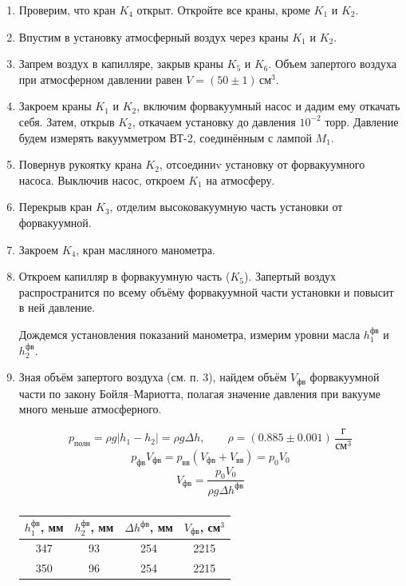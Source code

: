 \documentclass[a4paper,12pt]{article} %
\begin{document}
\begin{enumerate}

  \item Проверим, что кран $K_4$ открыт. Откройте все краны, кроме $K_1$ и $K_2$. 
  \item Впустим в установку атмосферный воздух через краны $K_1$ и $K_2$.
  \item Запрем воздух в капилляре, закрыв краны $K_5$ и $K_6$. Объем запертого воздуха при атмосферном давлении равен $V = (50 \pm 1) \, \text{см}^3$.
  \item Закроем краны $K_1$ и $K_2$, включим форвакуумный насос и дадим ему откачать себя. Затем, открыв $K_2$, откачаем установку до давления $10^{-2}$ торр. Давление будем измерять вакуумметром ВТ-2, соединённым с лампой $M_1$. 
  \item Повернув рукоятку крана $K_2$, отсоединиv установку от форвакуумного насоса. Выключив насос, откроем $K_1$ на атмосферу.
  \item Перекрыв кран $K_3$, отделим высоковакуумную часть установки от форвакуумной.
  \item Закроем $K_4$, кран масляного манометра.
  \item Откроем капилляр в форвакуумную часть ($K_5$). Запертый воздух распространится по всему объёму форвакуумной части установки и повысит в ней давление.
  
  Дождемся установления показаний манометра, измерим уровни масла $h_1^{\text{фв}}$ и $h_2^{\text{фв}}$.
  
  \item Зная объём запертого воздуха (см. п. 3), найдем объём $V_{\text{фв}}$ форвакуумной части по закону Бойля–Мариотта, полагая значение давления при вакууме много меньше атмосферного.
  
  \begin{equation}
    p_{\text{полн}} = \rho g |h_{1} - h_{2}| = \rho g \Delta h, \qquad \rho = (0.885 \pm 0.001) \, \frac{\text{г}}{\text{см}^3}
  \end{equation}
  \begin{equation}
    p_{\text{фв}} V_{\text{фв}} = p_{\text{вв}} (V_{\text{фв}} + V_{\text{вв}}) = p_0 V_0
  \end{equation}
  \begin{equation}
    V_{\text{фв}} = \frac{p_0 V_0}{\rho g \Delta h^{\text{фв}}}
  \end{equation}
  
  \begin{table}[h]
    \caption{}
    \begin{tabular}{|c|c|c|c|}
        \hline $h_1^{\text{фв}}$, мм  &  $h_2^{\text{фв}}$, мм & $\Delta h^{\text{фв}}$, мм  &  $V_{\text{фв}}$, см$^3$ \\
        \hline
        347 & 93  & 254 & 2215 \\
        350 & 96  & 254 & 2215 \\
        \hline 
    \end{tabular}
    \label{tab:pv_data}
  \end{table}
  

\end{enumerate}
\end{document}
